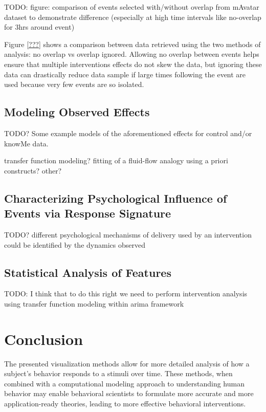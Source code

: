 \documentclass[review,journal]{vgtc}         %
\begin{document}
TODO: figure: comparison of events selected with/without overlap from mAvatar dataset to demonstrate difference (especially at high time intervals like no-overlap for 3hrs around event)

Figure \ref{???} shows a comparison between data retrieved using the two methods of analysis: no overlap vs overlap ignored.
Allowing no overlap between events helps ensure that multiple interventions effects do not skew the data, but ignoring these data can drastically reduce data sample if large times following the event are used because very few events are so isolated.

\subsection{Modeling Observed Effects}
TODO? Some example models of the aforementioned effects for control and/or knowMe data.

transfer function modeling?
fitting of a fluid-flow analogy using a priori constructs?
other?

\subsection{Characterizing Psychological Influence of Events via Response Signature}
TODO? different psychological mechanisms of delivery used by an intervention could be identified by the dynamics observed

\subsection{Statistical Analysis of Features}
TODO: I think that to do this right we need to perform intervention analysis using transfer function modeling within arima framework

\section{Conclusion}
The presented visualization methods allow for more detailed analysis of how a subject’s behavior responds to a stimuli over time.
These methods, when combined with a computational modeling approach to understanding human behavior may enable behavioral scientists to formulate more accurate and more application-ready theories, leading to more effective behavioral interventions.




\end{document}
